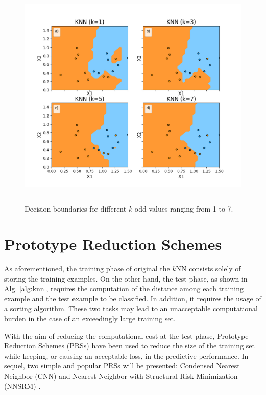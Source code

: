 \begin{figure}[h]
    \centering
    \includegraphics[height = 11cm, width =  14cm]{"Part 3 - Learning Systems/Supervised Learning/k-Nearest Neighbors/figures/decision_boundaries2.png"}
    \caption{Decision boundaries for different $k$ odd values ranging from 1 to 7.}
    \label{fig:decisionboundaries}
\end{figure}

\section{Prototype Reduction Schemes}

As aforementioned, the training phase of original the $k$NN consists solely of storing the training examples. On the other hand, the test phase, as shown in Alg. \ref{alg:knn}, requires the computation of the distance among each training example and the test example to be classified. In addition, it requires the usage of a sorting algorithm. These two tasks may lead to an unacceptable computational burden in the case of an exceedingly large training set. 

With the aim of reducing the computational cost at the test phase, Prototype Reduction Schemes (PRSs) have been used to reduce the size of the training set while keeping, or causing an acceptable loss, in the predictive performance. In sequel, two simple and popular PRSs will be presented: Condensed Nearest Neighbor (CNN) \cite{cnn:68} and Nearest Neighbor with Structural Risk Minimization (NNSRM) \cite{nnsrm:2003}.

